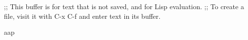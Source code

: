 ;; This buffer is for text that is not saved, and for Lisp evaluation.
;; To create a file, visit it with C-x C-f and enter text in its buffer.

aap